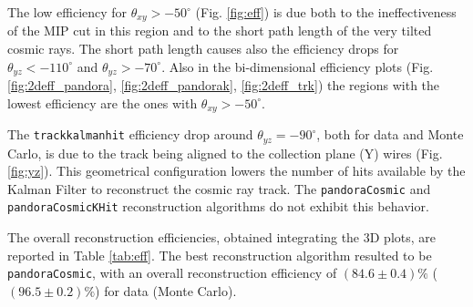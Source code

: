 \documentclass[a4paper]{scrartcl}
\begin{document}
The low efficiency for $\theta_{xy} > -50^{\circ}$ (Fig. \ref{fig:eff}) is due both to the ineffectiveness of the MIP cut in this region and to the short path length of the very tilted cosmic rays. The short path length causes also the efficiency drops for $\theta_{yz} < -110^{\circ}$ and $\theta_{yz} > -70^{\circ}$. Also in the bi-dimensional efficiency plots (Fig. \ref{fig:2deff_pandora}, \ref{fig:2deff_pandorak}, \ref{fig:2deff_trk}) the regions with the lowest efficiency are the ones with $\theta_{xy} > -50^{\circ}$. 

The \texttt{track\-kal\-man\-hit} efficiency drop around $\theta_{yz}=-90^{\circ}$, both for data and Monte Carlo, is due to the track being aligned to the collection plane (Y) wires (Fig. \ref{fig:yz}). This geometrical configuration lowers the number of hits available by the Kalman Filter to reconstruct the cosmic ray track. The  \texttt{pan\-do\-ra\-Co\-smic} and \texttt{pan\-do\-ra\-Co\-smic\-KHit} reconstruction algorithms do not exhibit this behavior.  


The overall reconstruction efficiencies, obtained integrating the 3D plots, are reported in Table \ref{tab:eff}. The best reconstruction algorithm resulted to be \texttt{pan\-do\-ra\-Co\-smic}, with an overall reconstruction efficiency of $(84.6\pm0.4)\%$ ($(96.5\pm0.2)\%$) for data (Monte Carlo).



\end{document}
